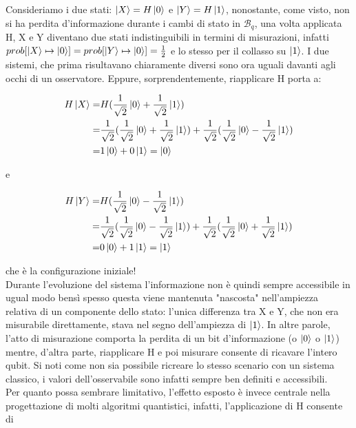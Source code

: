 \documentclass[12pt,a4paper,openright]{report}
\begin{document}
Consideriamo i due stati: $\ket{X} = H\ket0$ e $\ket{Y} = H\ket1$, nonostante, come visto, non si ha perdita d'informazione
durante i cambi di stato in $\mathcal{B}_q$, una volta applicata H, X e Y diventano due stati indistinguibili in termini di misurazioni, 
infatti $prob[\ket{X}\mapsto\ket0]=prob[\ket{Y}\mapsto\ket0]=\frac{1}{2}$ e lo stesso per il collasso su $\ket1$. I due sistemi, che prima risultavano chiaramente diversi sono ora uguali
davanti agli occhi di un osservatore. Eppure, sorprendentemente, riapplicare H porta a: 
\begin{center}
    \begin{align*}
        H\ket{X} =& H(\frac{1}{\sqrt2}\ket0 + \frac{1}{\sqrt2}\ket1) \\
                  =&\frac{1}{\sqrt2}(\frac{1}{\sqrt2}\ket0 + \frac{1}{\sqrt2}\ket1) + \frac{1}{\sqrt2}(\frac{1}{\sqrt2}\ket0 - \frac{1}{\sqrt2}\ket1) \\
                  =& 1\ket0 + 0\ket1 =\ket0
    \end{align*}
\end{center}
e
\begin{center}
    \begin{align*}
         H\ket{Y} =& H(\frac{1}{\sqrt2}\ket0 - \frac{1}{\sqrt2}\ket1) \\
                  =&\frac{1}{\sqrt2}(\frac{1}{\sqrt2}\ket0 - \frac{1}{\sqrt2}\ket1) + \frac{1}{\sqrt2}(\frac{1}{\sqrt2}\ket0 + \frac{1}{\sqrt2}\ket1) \\
                  =& 0\ket0 + 1\ket1 =\ket1
    \end{align*}
\end{center}
che è la configurazione iniziale!\\ Durante l'evoluzione del sistema l'informazione non è quindi sempre accessibile in ugual modo bensì
spesso questa viene mantenuta "nascosta" nell'ampiezza relativa di un componente dello stato: l'unica differenza tra X e Y, che non era misurabile direttamente,
stava nel segno dell'ampiezza di $\ket1$. In altre parole, l'atto di misurazione comporta la perdita di un bit d'informazione (o $\ket0$ o $\ket1$)  mentre, 
d'altra parte, riapplicare H e poi misurare consente di ricavare l'intero qubit. Si noti come non sia possibile ricreare lo stesso scenario con un sistema classico,
i valori dell'osservabile sono infatti sempre ben definiti e accessibili.\\
Per quanto possa sembrare limitativo, l'effetto esposto è invece centrale nella progettazione di molti algoritmi quantistici, infatti, l'applicazione di H consente di
\end{document}
